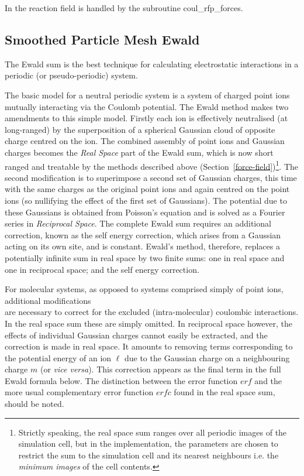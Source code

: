 In \D the reaction field is handled by the
subroutine {\sc coul\_rfp\_forces}.

\subsection{Smoothed Particle Mesh Ewald}
\label{SPME}

The Ewald sum \cite{allen-89a} is the best
technique for calculating electrostatic interactions in a periodic
(or pseudo-periodic) system.

The basic model for a neutral periodic system is a system of
charged point ions mutually interacting via the Coulomb potential.
The Ewald method makes two amendments to this simple model.
Firstly each ion is effectively neutralised (at long-ranged) by the
superposition of a spherical Gaussian
cloud of opposite charge centred on the ion.  The combined
assembly of point ions and Gaussian
charges becomes the {\em Real Space} part of the Ewald
sum, which is now short ranged and
treatable by the methods described above
(Section~\ref{force-field})\footnote{Strictly speaking, the real space sum
ranges over all periodic images of the simulation cell, but in the
\D implementation, the parameters are chosen to restrict the sum
to the simulation cell and its nearest neighbours i.e. the {\em
minimum images} of the cell contents.}.  The second modification
is to superimpose a second set of Gaussian charges, this time with
the same charges as the original point ions and again centred on
the point ions (so nullifying the effect of the first set of
Gaussians).  The potential due to these
Gaussians is obtained from Poisson's
equation and is solved as a Fourier series in {\em Reciprocal
Space}.  The complete Ewald sum requires an
additional correction, known as the self energy correction, which
arises from a Gaussian acting on its
own site, and is constant.  Ewald's method, therefore, replaces a
potentially infinite sum in real space by two finite sums: one in
real space and one in reciprocal space; and the self energy
correction.

For molecular systems, as opposed to systems comprised simply of
point ions, additional modifications \\  are
necessary to correct for the excluded (intra-molecular) coulombic
interactions. In the real space sum these are simply omitted.  In
reciprocal space however, the effects of individual
Gaussian charges cannot easily be
extracted, and the correction is made in real space.  It amounts
to removing terms corresponding to the potential energy of an ion
$\ell$ due to the Gaussian charge on a
neighbouring charge $m$ (or {\em vice versa}).  This correction
appears as the final term in the full Ewald
formula below.  The distinction between the error function $erf$
and the more usual complementary error function $erfc$ found in
the real space sum, should be noted.

